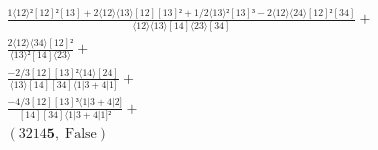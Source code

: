 \documentclass[varwidth, border=5pt]{standalone}
\begin{document}
\begin{my}
$\begin{gathered}
\scriptscriptstyle\frac{1⟨12⟩²[12]²[13]+2⟨12⟩⟨13⟩[12][13]²+1/2⟨13⟩²[13]³-2⟨12⟩⟨24⟩[12]²[34]}{⟨12⟩⟨13⟩[14]⟨23⟩[34]} +\\
\scriptscriptstyle\frac{2⟨12⟩⟨34⟩[12]²}{⟨13⟩²[14]⟨23⟩} +\\
\scriptscriptstyle\frac{-2/3[12][13]²⟨14⟩[24]}{⟨13⟩[14][34]⟨1|3+4|1]} +\\
\scriptscriptstyle\frac{-4/3[12][13]³⟨1|3+4|2]}{[14][34]⟨1|3+4|1]²} +\\
\scriptscriptstyle(3214𝟓,\;\text{False}) \phantom{+}
\end{gathered}$
\end{my}
\end{document}

